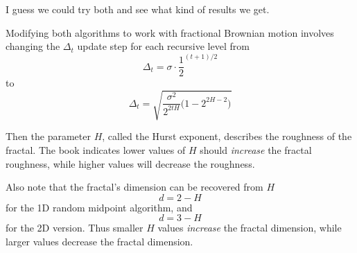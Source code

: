 \begin{algorithm}
\begin{algorithmic}
{                I guess we could try both and see what kind of results we get.
            }
                \State{}
                \State{}
                \State{}
                \State{}
            \EndIf{}
        \EndFunction{}
    \end{algorithmic}
    \caption{The 2D extension of Algorithm~\ref{prob3:alg:rmd1d}}\label{prob3:alg:rmd2d}
\end{algorithm}

Modifying both algorithms to work with fractional Brownian motion involves changing the $\Delta_t$ update step for each recursive level from
\begin{equation}
    \Delta_t = \sigma \cdot \frac{1}{2}^{(t + 1) / 2}\label{prob3:eqn:rmd-Delta}
\end{equation}
to
\begin{equation}
    \Delta_t = \sqrt{\frac{\sigma^2}{2^{2tH}} \big(1 - 2 ^ {2 H - 2}\big)}\label{prob3:eqn:fBm-Delta}
\end{equation}

Then the parameter $H$, called the Hurst exponent, describes the roughness of the fractal.
The book indicates lower values of $H$ should \textit{increase} the fractal roughness, while higher values will decrease the roughness.

Also note that the fractal's dimension can be recovered from $H$
\begin{equation}
    d = 2 - H\label{prob3:eqn:fractal-dimension-1d}
\end{equation}
for the 1D random midpoint algorithm, and
\begin{equation}
    d = 3 - H\label{prob3:eqn:fractal-dimension-2d}
\end{equation}
for the 2D version.
Thus smaller $H$ values \textit{increase} the fractal dimension, while larger values decrease the fractal dimension.

